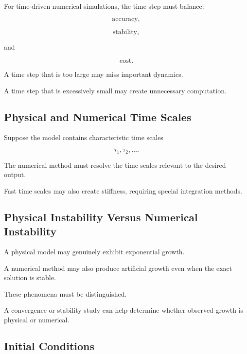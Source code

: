 For time-driven numerical simulations, the time step must balance:

\[
\boxed{
\text{accuracy},
}
\]

\[
\boxed{
\text{stability},
}
\]

and

\[
\boxed{
\text{cost}.
}
\]

A time step that is too large may miss important dynamics.

A time step that is excessively small may create unnecessary computation.

\subsection{Physical and Numerical Time Scales}
\label{subsec:physical-numerical-time-scales}

Suppose the model contains characteristic time scales

\[
\boxed{
\tau_1,
\tau_2,\ldots.
}
\]

The numerical method must resolve the time scales relevant to the desired
output.

Fast time scales may also create stiffness, requiring special integration
methods.

\subsection{Physical Instability Versus Numerical Instability}
\label{subsec:physical-vs-numerical-instability}

A physical model may genuinely exhibit exponential growth.

A numerical method may also produce artificial growth even when the exact
solution is stable.

These phenomena must be distinguished.

A convergence or stability study can help determine whether observed
growth is physical or numerical.

\subsection{Initial Conditions}
\label{subsec:simulation-initial-conditions}

